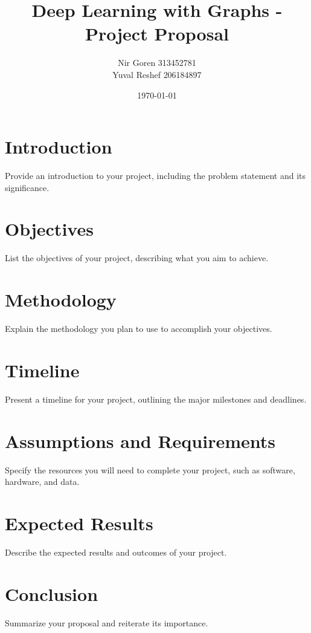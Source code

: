 \documentclass{article}
\title{Deep Learning with Graphs - Project Proposal}
\author{Nir Goren 313452781 \\ Yuval Reshef 206184897}
\date{\today}
\begin{document}
\maketitle

\section{Introduction}
Provide an introduction to your project, including the problem statement and its significance.

\section{Objectives}
List the objectives of your project, describing what you aim to achieve.

\section{Methodology}
Explain the methodology you plan to use to accomplish your objectives.

\section{Timeline}
Present a timeline for your project, outlining the major milestones and deadlines.

\section{Assumptions and Requirements}
Specify the resources you will need to complete your project, such as software, hardware, and data.

\section{Expected Results}
Describe the expected results and outcomes of your project.

\section{Conclusion}
Summarize your proposal and reiterate its importance.

\printbibliography
\end{document}
